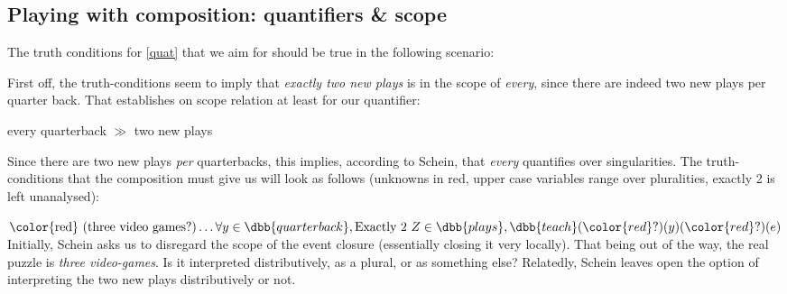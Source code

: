\begin{nothing}
\section{Playing with composition: quantifiers \& scope}

The truth conditions for \cref{quat} that we aim for should be true in the following scenario:

\ex \label{scenario}
\begin{center}
\end{center}
\xe
%


First off, the truth-conditions seem to imply that \emph{exactly two new plays} is in the scope of \emph{every}, since there are indeed two new plays per quarter back. That establishes on scope relation at least for our quantifier:

\begin{center}
every quarterback $\gg$ two new plays
\end{center}
%
Since there are two new plays \emph{per} quarterbacks, this implies, according to Schein, that \emph{every} quantifies over singularities. The truth-conditions that the composition must give us will look as follows (unknowns in red, upper case variables range over pluralities, exactly 2 is left unanalysed):

\ex
$\text{\color{red} (three video games?)} \ldots \forall y\in \dbb{quarterback}, \text{Exactly 2 } Z\in \dbb{plays},  \dbb{teach}({\color{red} ?})(y)({\color{red} ?})(e)$
\xe
%
Initially, Schein asks us to disregard the scope of the event closure (essentially closing it very locally). That being out of the way,
the real puzzle is \emph{three video-games}. Is it interpreted distributively, as a plural, or as something else? Relatedly, Schein leaves open the option of interpreting the two new plays distributively or not.


\end{nothing}
